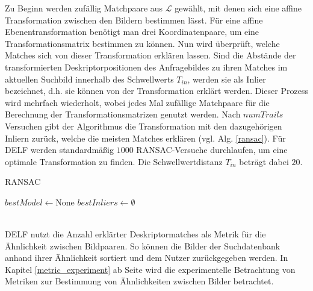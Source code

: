 Zu Beginn werden zufällig Matchpaare aus $\mathcal{L}$ gewählt, mit denen sich eine affine Transformation zwischen den Bildern bestimmen lässt. Für eine affine Ebenentransformation benötigt man drei Koordinatenpaare, um eine Transformationsmatrix bestimmen zu können. Nun wird überprüft, welche Matches sich von dieser Transformation erklären lassen. Sind die Abstände der transformierten Deskriptorpositionen des Anfragebildes zu ihren Matches im aktuellen Suchbild innerhalb des Schwellwerts $T_{in}$, werden sie als Inlier bezeichnet, d.h. sie können von der Transformation erklärt werden. Dieser Prozess wird mehrfach wiederholt, wobei jedes Mal zufällige Matchpaare für die Berechnung der Transformationsmatrizen genutzt werden.   Nach $numTrails$ Versuchen gibt der Algorithmus die Transformation mit den dazugehörigen Inliern zurück, welche die meisten Matches erklären (vgl. Alg. \ref{ransac}). Für DELF werden standardmäßig $1000$ RANSAC-Versuche durchlaufen, um eine optimale Transformation zu finden. Die Schwellwertdistanz $T_{in}$ beträgt dabei $20$. 
\begin{algorithm}[h]
\caption{RANSAC}
\label{ransac}
\DontPrintSemicolon
{}
$bestModel \leftarrow \text{None}$ \;
$bestInliers \leftarrow \emptyset$ \;
 \;
\end{algorithm}
\\
DELF nutzt die Anzahl erklärter Deskriptormatches als Metrik für die Ähnlichkeit zwischen Bildpaaren. So können die Bilder der Suchdatenbank anhand ihrer Ähnlichkeit sortiert und dem Nutzer zurückgegeben werden. In Kapitel \ref{metric_experiment} ab Seite \pageref{metric_experiment} wird die experimentelle Betrachtung von Metriken zur Bestimmung von Ähnlichkeiten zwischen Bilder betrachtet. 


